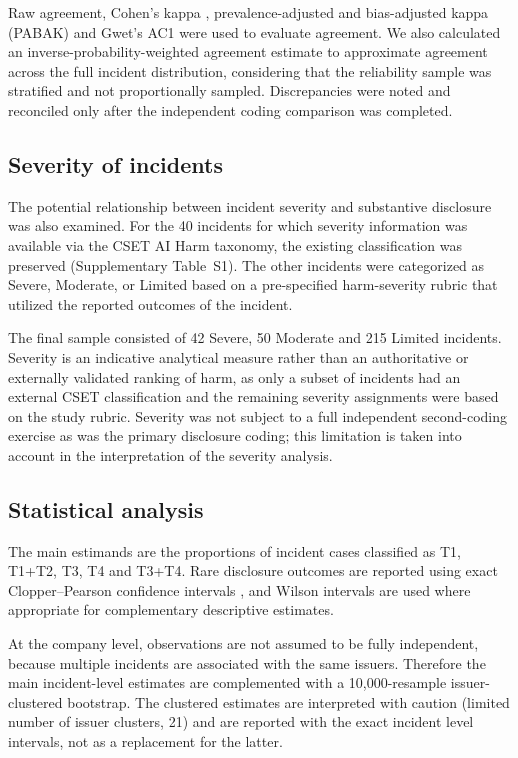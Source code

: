 \documentclass[utf8]{FrontiersinHarvard}
\begin{document}
Raw agreement, Cohen's kappa \citep{Cohen1960}, prevalence-adjusted and bias-adjusted kappa (PABAK) and Gwet's AC1 \citep{Gwet2008} were used to evaluate agreement. We also calculated an inverse-probability-weighted agreement estimate to approximate agreement across the full incident distribution, considering that the reliability sample was stratified and not proportionally sampled. Discrepancies were noted and reconciled only after the independent coding comparison was completed.

\subsection{Severity of incidents}\label{sec:sev}
The potential relationship between incident severity and substantive disclosure was also examined. For the 40 incidents for which severity information was available via the CSET AI Harm taxonomy, the existing classification was preserved (Supplementary Table~S1). The other incidents were categorized as Severe, Moderate, or Limited based on a pre-specified harm-severity rubric that utilized the reported outcomes of the incident.

The final sample consisted of 42 Severe, 50 Moderate and 215 Limited incidents. Severity is an indicative analytical measure rather than an authoritative or externally validated ranking of harm, as only a subset of incidents had an external CSET classification and the remaining severity assignments were based on the study rubric. Severity was not subject to a full independent second-coding exercise as was the primary disclosure coding; this limitation is taken into account in the interpretation of the severity analysis.

\subsection{Statistical analysis}
The main estimands are the proportions of incident cases classified as T1, T1+T2, T3, T4 and T3+T4. Rare disclosure outcomes are reported using exact Clopper--Pearson confidence intervals \citep{ClopperPearson1934}, and Wilson intervals \citep{Wilson1927} are used where appropriate for complementary descriptive estimates.

At the company level, observations are not assumed to be fully independent, because multiple incidents are associated with the same issuers. Therefore the main incident-level estimates are complemented with a 10,000-resample issuer-clustered bootstrap. The clustered estimates are interpreted with caution (limited number of issuer clusters, 21) and are reported with the exact incident level intervals, not as a replacement for the latter.
\end{document}
